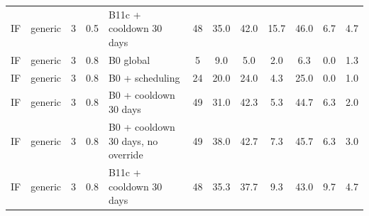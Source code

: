 \begin{longtable}{lllllccccccc}
IF & generic & 3 & 0.5 & B11c + cooldown 30 days & 48 & 35.0 & 42.0 & 15.7 & 46.0 & 6.7 & 4.7 \\
IF & generic & 3 & 0.8 & B0 global & 5 & 9.0 & 5.0 & 2.0 & 6.3 & 0.0 & 1.3 \\
IF & generic & 3 & 0.8 & B0 + scheduling & 24 & 20.0 & 24.0 & 4.3 & 25.0 & 0.0 & 1.0 \\
IF & generic & 3 & 0.8 & B0 + cooldown 30 days & 49 & 31.0 & 42.3 & 5.3 & 44.7 & 6.3 & 2.0 \\
IF & generic & 3 & 0.8 & B0 + cooldown 30 days, no override & 49 & 38.0 & 42.7 & 7.3 & 45.7 & 6.3 & 3.0 \\
IF & generic & 3 & 0.8 & B11c + cooldown 30 days & 48 & 35.3 & 37.7 & 9.3 & 43.0 & 9.7 & 4.7 \\
\bottomrule
\end{longtable}

